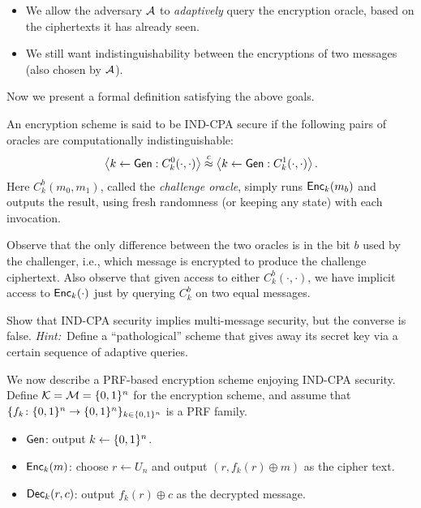 \documentclass[11pt]{article}
\begin{document}
\begin{itemize}
\item We allow the adversary $\mathcal{A}$ to \emph{adaptively} query the
  encryption oracle, based on the ciphertexts it has already seen.
\item We still want indistinguishability between the encryptions of
  two messages (also chosen by $\mathcal{A}$).
\end{itemize}

Now we present a formal definition satisfying the above goals.

\begin{definition}
  \label{def:ind-cpa}
  An encryption scheme is said to be IND-CPA secure if the following
  pairs of oracles are computationally indistinguishable:
  \[ \left\langle k \gets \mathsf{Gen} : C^0_k(\cdot, \cdot) \right\rangle
  \stackrel{c}{\approx} \left\langle k \gets \mathsf{Gen} : C^1_k(\cdot, \cdot)
  \right\rangle. \] Here $C^{b}_{k}(m_{0}, m_{1})$, called the
  \emph{challenge oracle}, simply runs $\mathsf{Enc}_{k}(m_{b})$ and
  outputs the result, using fresh randomness (or keeping any state)
  with each invocation.
\end{definition}

Observe that the only difference between the two oracles is in the bit
$b$ used by the challenger, i.e., which message is encrypted to
produce the challenge ciphertext.  Also observe that given access to
either $C^{b}_{k}(\cdot,\cdot)$, we have implicit access to
$\mathsf{Enc}_{k}(\cdot)$ just by querying $C^{b}_{k}$ on two equal
messages.

\begin{exercise}
  Show that IND-CPA security implies
  multi-message security, but the converse is false.  \textit{Hint:}~Define a
  ``pathological'' scheme that gives away its secret key via a certain sequence of
  adaptive queries.
\end{exercise}

\vspace{\baselineskip}
We now describe a PRF-based encryption scheme enjoying IND-CPA
security.  Define $\mathcal{K} = \mathcal{M} = \{0,1\}^{n}$ for the
encryption scheme, and assume that $\{f_{k} \colon \{0,1\}^{n} \to
  \{0,1\}^{n}\}_{k \in \{0,1\}^{n}}$ is a PRF family.
\begin{itemize}
\item $\mathsf{Gen}$: output $k \gets \{0,1\}^n$.
\item $\mathsf{Enc}_k(m)$: choose $r \gets U_n$ and output $(r, f_k(r)
  \oplus m)$ as the cipher text.
\item $\mathsf{Dec}_k(r,c)$: output $f_k(r) \oplus c$ as the decrypted
  message.
\end{itemize}
\end{document}
